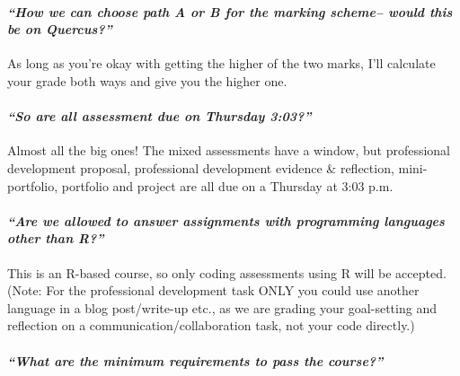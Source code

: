 \documentclass[
  openany]{book}
\begin{document}
\hypertarget{how-we-can-choose-path-a-or-b-for-the-marking-scheme-would-this-be-on-quercus}{%
\paragraph{\texorpdfstring{\emph{``How we can choose path A or B for the marking scheme-- would this be on Quercus?''}}{``How we can choose path A or B for the marking scheme-- would this be on Quercus?''}}\label{how-we-can-choose-path-a-or-b-for-the-marking-scheme-would-this-be-on-quercus}}

As long as you're okay with getting the higher of the two marks, I'll calculate your grade both ways and give you the higher one.

\hypertarget{so-are-all-assessment-due-on-thursday-303}{%
\paragraph{\texorpdfstring{\emph{``So are all assessment due on Thursday 3:03?''}}{``So are all assessment due on Thursday 3:03?''}}\label{so-are-all-assessment-due-on-thursday-303}}

Almost all the big ones! The mixed assessments have a window, but professional development proposal, professional development evidence \& reflection, mini-portfolio, portfolio and project are all due on a Thursday at 3:03 p.m.

\hypertarget{are-we-allowed-to-answer-assignments-with-programming-languages-other-than-r}{%
\paragraph{\texorpdfstring{\emph{``Are we allowed to answer assignments with programming languages other than R?''}}{``Are we allowed to answer assignments with programming languages other than R?''}}\label{are-we-allowed-to-answer-assignments-with-programming-languages-other-than-r}}

This is an R-based course, so only coding assessments using R will be accepted. (Note: For the professional development task ONLY you could use another language in a blog post/write-up etc., as we are grading your goal-setting and reflection on a communication/collaboration task, not your code directly.)

\hypertarget{what-are-the-minimum-requirements-to-pass-the-course}{%
\paragraph{\texorpdfstring{\emph{``What are the minimum requirements to pass the course?''}}{``What are the minimum requirements to pass the course?''}}\label{what-are-the-minimum-requirements-to-pass-the-course}}
\end{document}
